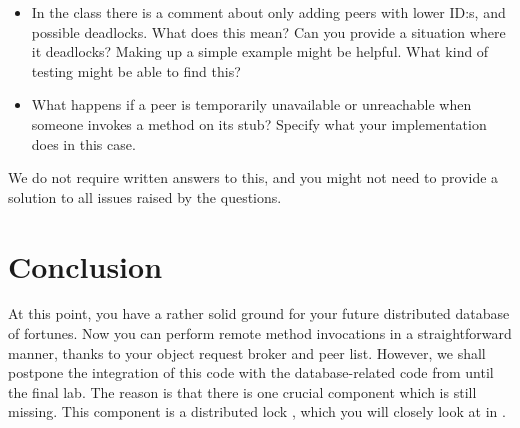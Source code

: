 \documentclass[a4paper]{article}
\begin{document}
\begin{itemize}
\item In the  class there is a comment about only
  adding peers with lower ID:s, and possible deadlocks. What does this
  mean? Can you provide a situation where it deadlocks? Making up a
  simple example might be helpful. What kind of testing might be able
  to find this?
  \item What happens if a peer is temporarily unavailable or
    unreachable when someone invokes a method on its stub? Specify
    what your implementation does in this case.
\end{itemize}

We do not require written answers to this, and you might not need to
provide a solution to all issues raised by the questions.


\section{Conclusion}
At this point, you have a rather solid ground for your future distributed
database of fortunes. Now you can perform remote method invocations in a
straightforward manner, thanks to your object request broker and peer list.
However, we shall postpone the integration of this code with the
database-related code from  until the final lab. The reason is that
there is one crucial component which is still missing. This component is a
distributed lock \cite{lecture67}, which you will closely look at in .

\printbibliography
\end{document}
